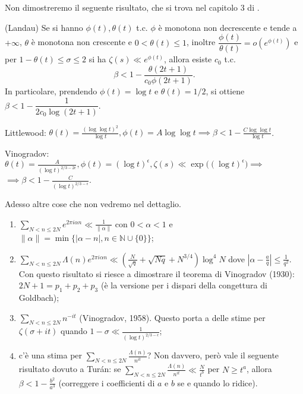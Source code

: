 Non dimostreremo il seguente risultato, che si trova nel capitolo 3 di \cite{T}.

\begin{thm}
  (Landau) Se si hanno $\phi(t), \theta(t)$ t.c. $\phi$ è monotona non decrescente e tende a $+\infty$, $\theta$ è monotona non crescente e $0 < \theta(t) \le 1$, inoltre $\dfrac{\phi(t)}{\theta(t)}=o(e^{\phi(t)})$ e per $1-\theta(t) \le \sigma \le 2$ si ha $\zeta(s) \ll e^{\phi(t)}$, allora esiste $c_0$ t.c.
  $$\beta<1-\frac{\theta(2t+1)}{c_0\phi(2t+1)}.$$
  In particolare, prendendo $\phi(t)=\log{t}$ e $\theta(t)=1/2$, si ottiene $\beta<1-\dfrac{1}{2c_0\log(2t+1)}$.
\end{thm}

Littlewood: $\theta(t)=\frac{(\log\log{t})^2}{\log{t}}, \phi(t)=A\log\log{t} \implies \beta<1-\frac{C\log\log{t}}{\log{t}}$.

Vinogradov: $\theta(t)=\frac{A}{(\log{t})^{2/3-2\epsilon}}, \phi(t)=(\log{t})^{\epsilon}, \zeta(s) \ll \exp\big((\log{t})^{\epsilon}\big) \implies$ \\
$\implies \beta<1-\frac{C}{(\log{t})^{2/3-\epsilon}}$.

Adesso altre cose che non vedremo nel dettaglio.

\begin{enumerate}
  \item $\displaystyle \sum_{N<n \le 2N} e^{2\pi i\alpha n} \ll \frac{1}{\|\alpha\|}$ con $0<\alpha<1$ e $\|\alpha\|=\min\big\{|\alpha-n|, n \in \mathbb{N}\cup\{0\}\big\}$;
  \item $\displaystyle \sum_{N<n \le 2N} \Lambda(n)e^{2\pi i\alpha n} \ll \left(\frac{N}{\sqrt{q}}+\sqrt{Nq}+N^{3/4}\right)\log^4{N}$ dove $\left|\alpha-\frac{a}{q}\right| \le \frac{1}{q^2}$.
  Con questo risultato si riesce a dimostrare il teorema di Vinogradov (1930): $2N+1=p_1+p_2+p_3$ (è la versione per i dispari della congettura di Goldbach);
  \item $\displaystyle \sum_{N<n \le 2N} n^{-it}$ (Vinogradov, 1958). Questo porta a delle stime per $\zeta(\sigma+it)$ quando $1-\sigma \ll \frac{1}{(\log{t})^{2/3-\epsilon}}$;
  \item c'è una stima per $\displaystyle \sum_{N<n \le 2N} \frac{\Lambda(n)}{n^{it}}$? Non davvero, però vale il seguente risultato dovuto a Turán: se $\displaystyle \sum_{N<n \le 2N} \frac{\Lambda(n)}{n^{it}} \ll \frac{N}{t^b}$ per $N \ge t^a$, allora $\beta<1-\frac{b^2}{a^3}$ (correggere i coefficienti di $a$ e $b$ se e quando lo ridice).
\end{enumerate}
